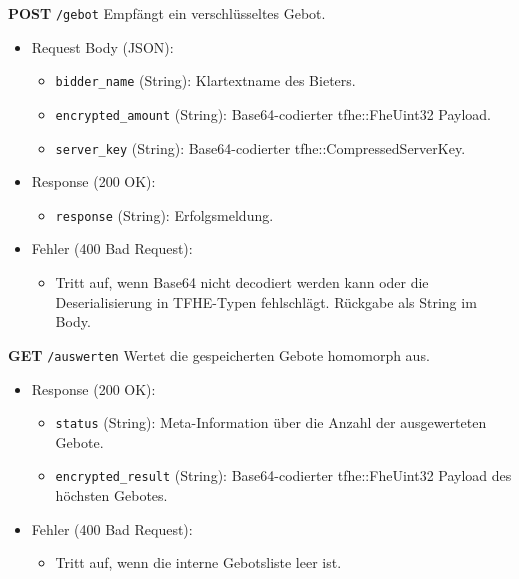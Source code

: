 \textbf{POST} \verb|/gebot| Empfängt ein verschlüsseltes Gebot.
\begin{itemize}
    \item Request Body (JSON):
    \begin{itemize}
        \item \verb|bidder_name| (String): Klartextname des Bieters.
        \item \verb|encrypted_amount| (String): Base64-codierter tfhe::FheUint32 Payload.
        \item \verb|server_key| (String): Base64-codierter tfhe::CompressedServerKey.
    \end{itemize}
    \item Response (200 OK):
    \begin{itemize}
        \item \verb|response| (String): Erfolgsmeldung.
    \end{itemize}
    \item Fehler (400 Bad Request):
    \begin{itemize}
        \item Tritt auf, wenn Base64 nicht decodiert werden kann oder die Deserialisierung in TFHE-Typen fehlschlägt. Rückgabe als String im Body.
    \end{itemize}
\end{itemize}

\textbf{GET} \verb|/auswerten| Wertet die gespeicherten Gebote homomorph aus.
\begin{itemize}
    \item Response (200 OK):
    \begin{itemize}
        \item \verb|status| (String): Meta-Information über die Anzahl der ausgewerteten Gebote.
        \item \verb|encrypted_result| (String): Base64-codierter tfhe::FheUint32 Payload des höchsten Gebotes.
    \end{itemize}
    \item Fehler (400 Bad Request):
    \begin{itemize}
        \item Tritt auf, wenn die interne Gebotsliste leer ist.
    \end{itemize}
\end{itemize}

